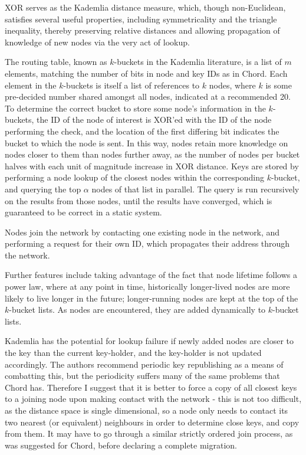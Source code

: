 XOR serves as the Kademlia distance measure, which, though non-Euclidean, satisfies several useful properties, including symmetricality and the triangle inequality, thereby preserving relative distances and allowing propagation of knowledge of new nodes via the very act of lookup.

The routing table, known as $k$-buckets in the Kademlia literature, is a list of $m$ elements, matching the number of bits in node and key IDs as in Chord.
Each element in the $k$-buckets is itself a list of references to $k$ nodes, where $k$ is some pre-decided number shared amongst all nodes, indicated at a recommended 20.
To determine the correct bucket to store some node's information in the $k$-buckets, the ID of the node of interest is XOR'ed with the ID of the node performing the check, and the location of the first differing bit indicates the bucket to which the node is sent.
In this way, nodes retain more knowledge on nodes closer to them than nodes further away, as the number of nodes per bucket halves with each unit of magnitude increase in XOR distance.
Keys are stored by performing a node lookup of the closest nodes within the corresponding $k$-bucket, and querying the top $\alpha$ nodes of that list in parallel.
The query is run recursively on the results from those nodes, until the results have converged, which is guaranteed to be correct in a static system.

Nodes join the network by contacting one existing node in the network, and performing a request for their own ID, which propagates their address through the network.

Further features include taking advantage of the fact that node lifetime follows a power law, where at any point in time, historically longer-lived nodes are more likely to live longer in the future; longer-running nodes are kept at the top of the $k$-bucket lists.
As nodes are encountered, they are added dynamically to $k$-bucket lists.

Kademlia has the potential for lookup failure if newly added nodes are closer to the key than the current key-holder, and the key-holder is not updated accordingly.
The authors recommend periodic key republishing as a means of combatting this, but the periodicity suffers many of the same problems that Chord has.
Therefore I suggest that it is better to force a copy of all closest keys to a joining node upon making contact with the network - this is not too difficult, as the distance space is single dimensional, so a node only needs to contact its two nearest (or equivalent) neighbours in order to determine close keys, and copy from them.
It may have to go through a similar strictly ordered join process, as was suggested for Chord, before declaring a complete migration.

